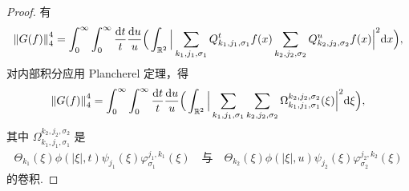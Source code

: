 \begin{proof}
有
\begin{align*}
  \left\|G(f)\right\|_{4}^{4}
  =\int_{0}^{\infty}\int_{0}^{\infty}\frac{\mathrm{d}t}{t}\frac{\mathrm{d}u}{u}
  \Big(\int_{\mathbb{R}^{2}}\Big|\sum_{k_{1},j_{1},\sigma_{1}}Q_{k_{1},j_{1},\sigma_{1}}^{t}f(x)
  \sum_{k_{2},j_{2},\sigma_{2}}Q_{k_{2},j_{2},\sigma_{2}}^{u}f(x)\Big|^{2}\mathrm{d}x\Big),
\end{align*}
对内部积分应用 Plancherel 定理，得
\begin{align*}
  \left\|G(f)\right\|_{4}^{4}
  =\int_{0}^{\infty}\int_{0}^{\infty}\frac{\mathrm{d}t}{t}\frac{\mathrm{d}u}{u}
  \Big(\int_{\mathbb{R}^{2}}\Big|\sum_{k_{1},j_{1},\sigma_{1}}\sum_{k_{2},j_{2},\sigma_{2}}
  \Omega_{k_{1},j_{1},\sigma_{1}}^{k_{2},j_{2},\sigma_{2}}(\xi)\Big|^{2}\mathrm{d}\xi\Big),
\end{align*}
其中 $\Omega_{k_{1},j_{1},\sigma_{1}}^{k_{2},j_{2},\sigma_{2}}$ 是
\begin{align*}
  \Theta_{k_{1}}(\xi)\phi(|\xi|,t)\psi_{j_{1}}(\xi)\varphi_{\sigma_{1}}^{j_{1},k_{1}}(\xi)
  \quad\text{与}\quad
  \Theta_{k_{2}}(\xi)\phi(|\xi|,u)\psi_{j_{2}}(\xi)\varphi_{\sigma_{2}}^{j_{2},k_{2}}(\xi)
\end{align*}
的卷积.


\end{proof}
